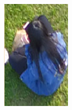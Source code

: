 \begin{figure}[h]
\begin{subfigure}[h]{0.11\textwidth}
        \includegraphics[width=\textwidth]{figures/样本标注示例8.png}
    \end{subfigure}
    ~ %
    \begin{subfigure}[h]{0.11\textwidth}

\end{subfigure}
\end{figure}
